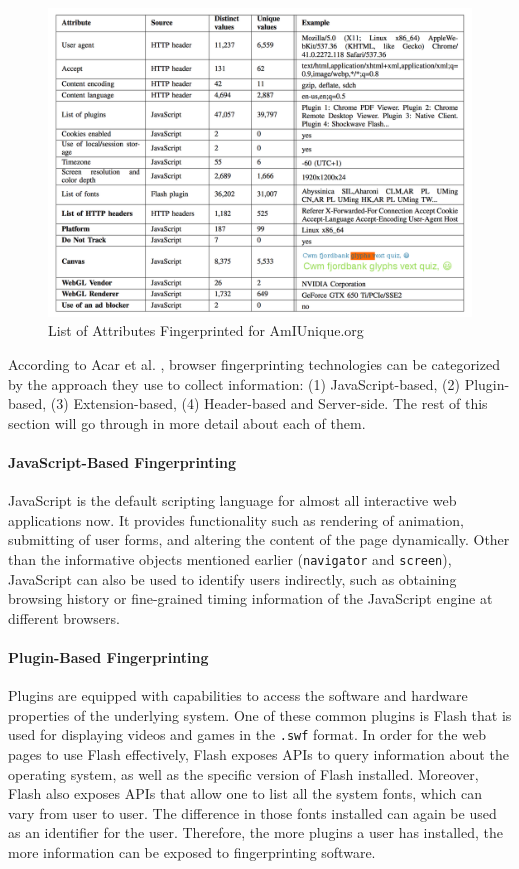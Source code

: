 \documentclass{acm_proc_article-sp}
\begin{document}
\begin{figure}[h]
    \centering
    \includegraphics[width=\textwidth]{assets/amiunique.png}
    \caption{List of Attributes Fingerprinted for AmIUnique.org}
    \label{fig:amiunique}
\end{figure}


According to Acar et al. \cite{acar:fpd}, browser fingerprinting technologies can be categorized by the approach they use to collect information: (1) JavaScript-based, (2) Plugin-based, (3) Extension-based, (4) Header-based and Server-side.
The rest of this section will go through in more detail about each of them.

\paragraph{JavaScript-Based Fingerprinting}
JavaScript is the default scripting language for almost all interactive web applications now. It provides functionality such as rendering of animation, submitting of user forms, and altering the content of the page dynamically. 
Other than the informative objects mentioned earlier (\verb|navigator| and \verb|screen|), JavaScript can also be used to identify users indirectly, such as obtaining  browsing history or fine-grained timing information of the JavaScript engine at different browsers.

\paragraph{Plugin-Based Fingerprinting}
Plugins are equipped with capabilities to access the software and hardware properties of the underlying system. One of these common plugins is Flash that is used for displaying videos and games in the \verb|.swf| format. In order for the web pages to use Flash effectively, Flash exposes APIs to query  information about the operating system, as well as the specific version of Flash installed.
Moreover, Flash also exposes APIs that allow one to list all the system fonts, which can vary from user to user. The difference in those fonts installed can again be used as an identifier for the user.
Therefore, the more plugins a user has installed, the more information can be exposed to fingerprinting software.
\end{document}
